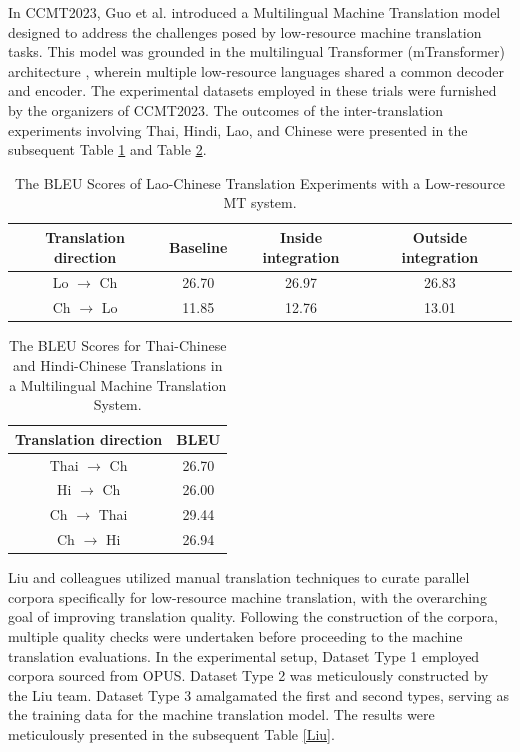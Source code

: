 \documentclass[acmsmall]{acmart}
\begin{document}
\color{red}
In CCMT2023, Guo et al. \cite{10.1007/978-981-99-7894-69} introduced a Multilingual Machine Translation model designed to address the challenges posed by low-resource machine translation tasks. This model was grounded in the multilingual Transformer (mTransformer) architecture \cite{johnson2017google}, wherein multiple low-resource languages shared a common decoder and encoder. The experimental datasets employed in these trials were furnished by the organizers of CCMT2023. The outcomes of the inter-translation experiments involving Thai, Hindi, Lao, and Chinese were presented in the subsequent Table \ref{GuoA} and Table \ref{GuoB}.
\color{black}



\begin{table}[h!]
\centering
\caption{The BLEU Scores of Lao-Chinese Translation Experiments with a Low-resource MT system.}
\label{GuoA}
\begin{tabular}{cccc}
\toprule
Translation direction & Baseline & Inside integration & Outside integration \\
\midrule
Lo $\rightarrow$ Ch & 26.70 & 26.97 & 26.83 \\
Ch $\rightarrow$ Lo & 11.85 & 12.76 & 13.01 \\
\bottomrule
\end{tabular}
\end{table}

\begin{table}[h!]
\centering
\caption{The BLEU Scores for Thai-Chinese and Hindi-Chinese Translations in a Multilingual Machine Translation System.}
\label{GuoB}
\begin{tabular}{cc}
\toprule
Translation direction & BLEU \\
\midrule
Thai $\rightarrow$ Ch & 26.70 \\
Hi $\rightarrow$ Ch & 26.00 \\
Ch $\rightarrow$ Thai & 29.44 \\
Ch $\rightarrow$ Hi & 26.94 \\
\bottomrule
\end{tabular}
\end{table}


\color{red}
Liu and colleagues \cite{4-2-32} utilized manual translation techniques to curate parallel corpora specifically for low-resource machine translation, with the overarching goal of improving translation quality. Following the construction of the corpora, multiple quality checks were undertaken before proceeding to the machine translation evaluations. In the experimental setup, Dataset Type 1 employed corpora sourced from OPUS. Dataset Type 2 was meticulously constructed by the Liu team. Dataset Type 3 amalgamated the first and second types, serving as the training data for the machine translation model. The results were meticulously presented in the subsequent Table \ref{Liu}.
\color{black}
\end{document}
